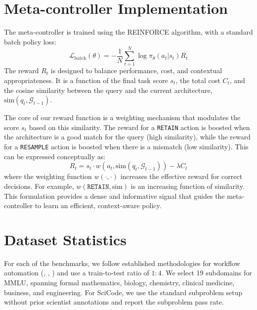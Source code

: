 \documentclass{article} %
\begin{document}
\section{Meta-controller Implementation}
\label{app:meta_impl}
The meta-controller is trained using the REINFORCE algorithm, with a standard batch policy loss:
\begin{equation}
    \mathcal{L}_\text{batch}(\theta) = -\frac{1}{N} \sum_{t=1}^{N} \log \pi_\theta (a_t |s_t)R_t
\end{equation}
The reward \(R_t\) is designed to balance performance, cost, and contextual appropriateness. It is a function of the final task score \(s_t\), the total cost \(C_t\), and the cosine similarity between the query and the current architecture, \(\text{sim}(q_t, \mathcal{G}_{t-1})\).

The core of our reward function is a weighting mechanism that modulates the score \(s_t\) based on this similarity. The reward for a \texttt{RETAIN} action is boosted when the architecture is a good match for the query (high similarity), while the reward for a \texttt{RESAMPLE} action is boosted when there is a mismatch (low similarity). This can be expressed conceptually as:
\begin{equation}
    R_t = s_t \cdot w(a_t, \text{sim}(q_t, \mathcal{G}_{t-1})) - \lambda C_t
\end{equation}
where the weighting function \(w(\cdot, \cdot)\) increases the effective reward for correct decisions. For example, \(w(\texttt{RETAIN}, \text{sim})\) is an increasing function of similarity. This formulation provides a dense and informative signal that guides the meta-controller to learn an efficient, context-aware policy.

\section{Dataset Statistics}
\label{app:dataset_stats}

For each of the benchmarks, we follow established methodologies for workflow automation (\citet{hu2024automated}, \citet{zhang2024aflow}, \citet{zhang2025multi}) and use a train-to-test ratio of \(1:4\). We select 19 subdomains for MMLU, spanning formal mathematics, biology, chemistry, clinical medicine, business, and engineering. For SciCode, we use the standard subproblem setup without prior scientist annotations and report the subproblem pass rate. 
\end{document}
